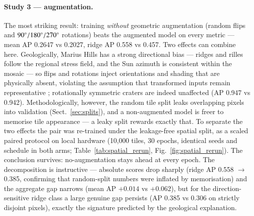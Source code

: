 \documentclass{aa}
\begin{document}
\paragraph{Study 3 --- augmentation.}
The most striking result: training \emph{without} geometric augmentation (random flips and $90\degree/180\degree/270\degree$ rotations) beats the augmented model on every metric --- mean AP 0.2647 vs 0.2027, ridge AP 0.558 vs 0.457. Two effects can combine here. Geologically, Marius Hills has a strong directional bias --- ridges and rilles follow the regional stress field, and the Sun azimuth is consistent within the mosaic --- so flips and rotations inject orientations and shading that are physically absent, violating the assumption that transformed inputs remain representative \citep{shorten2019augmentation}; rotationally symmetric craters are indeed unaffected (AP 0.947 vs 0.942). Methodologically, however, the random tile split leaks overlapping pixels into validation (Sect.~\ref{sec:splits}), and a non-augmented model is freer to memorise tile appearance --- a leaky split rewards exactly that. To separate the two effects the pair was re-trained under the leakage-free spatial split, as a scaled paired protocol on local hardware (10{,}000 tiles, 30 epochs, identical seeds and schedule in both arms; Table~\ref{tab:spatial_rerun}, Fig.~\ref{fig:spatial_rerun}). The conclusion survives: no-augmentation stays ahead at every epoch. The decomposition is instructive --- absolute scores drop sharply (ridge AP 0.558 $\to$ 0.385, confirming that random-split numbers were inflated by memorisation) and the aggregate gap narrows (mean AP $+0.014$ vs $+0.062$), but for the direction-sensitive ridge class a large genuine gap persists (AP 0.385 vs 0.306 on strictly disjoint pixels), exactly the signature predicted by the geological explanation.

\begin{table}[htbp]
\centering
\caption{Best result from each ablation study (full T4 protocol, 30 epochs; random tile split).}
\label{tab:final_summary}
\end{table}
\end{document}
